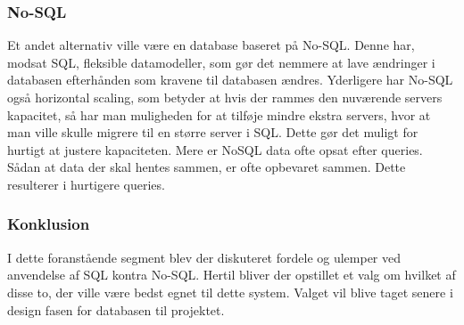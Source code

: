 \subsubsection{No-SQL}
Et andet alternativ ville være en database baseret på No-SQL. Denne har, modsat SQL, fleksible datamodeller, som gør det nemmere at lave ændringer i databasen efterhånden som kravene til databasen ændres. Yderligere har No-SQL også horizontal scaling, som betyder at hvis der rammes den nuværende servers kapacitet, så har man muligheden for at tilføje mindre ekstra servers, hvor at man ville skulle migrere til en større server i SQL. Dette gør det muligt for hurtigt at justere kapaciteten. 
Mere er NoSQL data ofte opsat efter queries. Sådan at data der skal hentes sammen, er ofte opbevaret sammen. Dette resulterer i hurtigere queries.

\subsubsection{Konklusion}
I dette foranstående segment blev der diskuteret fordele og ulemper ved anvendelse af SQL kontra No-SQL. Hertil bliver der opstillet et valg om hvilket af disse to, der ville være bedst egnet til dette system. Valget vil blive taget senere i design fasen for databasen til projektet.\\
\cite{Yalantis} \cite{IBM} \cite{MongoDB.com}

